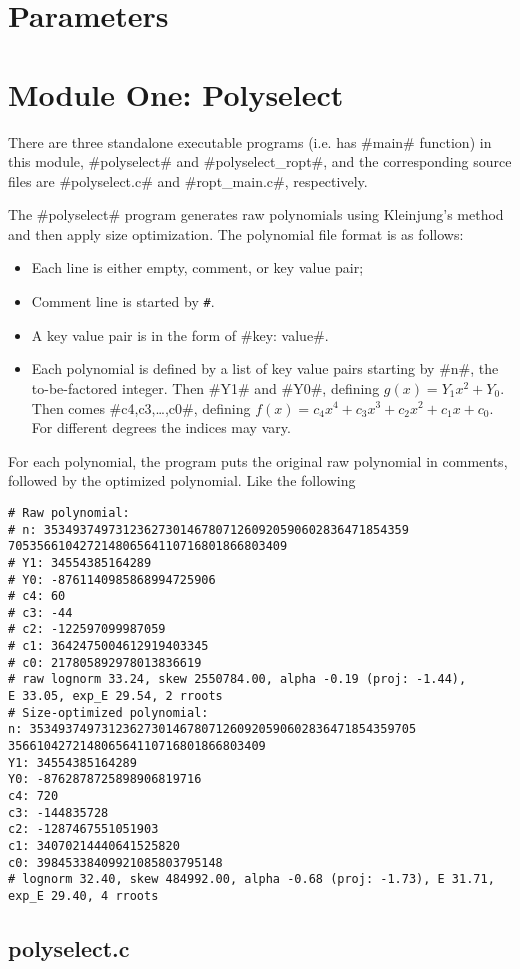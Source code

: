 \documentclass[a4paper]{article}
\begin{document}
\section{Parameters}

\section{Module One: Polyselect}

There are three standalone executable programs (i.e. has #main# function) in this module,
#polyselect# and #polyselect_ropt#, and the corresponding source files are #polyselect.c# and #ropt_main.c#,
respectively.

The #polyselect# program generates raw polynomials using Kleinjung's method and then apply size optimization.
The polynomial file format is as follows:
\begin{itemize}
  \item Each line is either empty, comment, or key value pair;
  \item Comment line is started by \verb=#=.
  \item A key value pair is in the form of #key: value#.
  \item Each polynomial is defined by a list of key value pairs starting by #n#, the to-be-factored integer.
	Then #Y1# and #Y0#, defining $g(x)=Y_1x^2+Y_0$.
	Then comes #c4,c3,\ldots,c0#, defining $f(x)=c_4x^4+c_3x^3+c_2x^2+c_1x+c_0$.
	For different degrees the indices may vary.
\end{itemize}
For each polynomial, the program puts the original raw polynomial in comments,
followed by the optimized polynomial. Like the following
\begin{verbatim}
# Raw polynomial:
# n: 353493749731236273014678071260920590602836471854359
705356610427214806564110716801866803409
# Y1: 34554385164289
# Y0: -8761140985868994725906
# c4: 60
# c3: -44
# c2: -122597099987059
# c1: 3642475004612919403345
# c0: 217805892978013836619
# raw lognorm 33.24, skew 2550784.00, alpha -0.19 (proj: -1.44),
E 33.05, exp_E 29.54, 2 rroots
# Size-optimized polynomial:
n: 353493749731236273014678071260920590602836471854359705
356610427214806564110716801866803409
Y1: 34554385164289
Y0: -8762878725898906819716
c4: 720
c3: -144835728
c2: -1287467551051903
c1: 34070214440641525820
c0: 39845338409921085803795148
# lognorm 32.40, skew 484992.00, alpha -0.68 (proj: -1.73), E 31.71,
exp_E 29.40, 4 rroots
\end{verbatim}

\subsection{polyselect.c}
\end{document}
